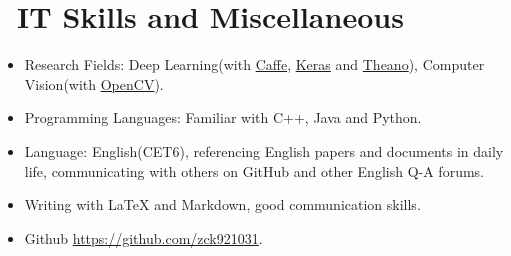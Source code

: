 \documentclass{resume}
\begin{document}
\section{\faCogs\ IT Skills and Miscellaneous}
\begin{itemize}[parsep=0.5ex]
	\item Research Fields: Deep Learning(with \href{http://caffe.berkeleyvision.org/}{Caffe}, \href{https://keras.io/}{Keras} and \href{http://deeplearning.net/software/theano/}{Theano}), Computer Vision(with \href{http://opencv.org/}{OpenCV}).
	\item Programming Languages: Familiar with C++, Java and Python.
  \item Language: English(CET6), referencing English papers and documents in daily life, communicating with others on GitHub and other English Q-A forums.
  \item Writing with LaTeX and Markdown, good communication skills.
  \item \faGithub Github \href{https://github.com/zck921031}{https://github.com/zck921031}.
\end{itemize}

%
%
\end{document}
